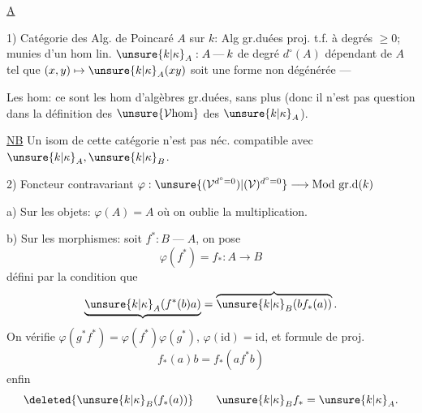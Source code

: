 
\uline{A}

1) Catégorie  des Alg. de Poincaré $A$ sur $k$: Alg gr.duées proj.  t.f. à degrés $\geq0$; munies d'un hom lin. $\unsure{k|\kappa}_A:A\mathbin{\text{---}}k$ de degré $d^\circ(A)$ dépendant de $A$ tel que $(x,y)\mapsto\unsure{k|\kappa}_A(xy)$ soit une forme  non dégénérée ---

Les hom: ce sont les hom d'algèbres gr.duées, sans plus (donc il n'est pas question dans la définition des $\unsure{\mathcal V\mathrm{hom}}$ des $\unsure{k|\kappa}_A$).

\uline{NB} Un isom de cette catégorie n'est pas néc. compatible avec  $\unsure{k|\kappa}_A,\unsure{k|\kappa}_B$.

2) Foncteur contravariant $\varphi:\unsure{(\mathcal V^{d^\circ=0})|(\mathcal V)^{d^\circ=0}}\longrightarrow\mathrm{Mod\ gr.d}(k)$

\quad a) Sur les objets: $\varphi(A)=A$ où on oublie la multiplication.

\quad b) Sur les morphismes: soit $f^*:B\mathbin{\text{---}}A$, on pose
\[
\varphi(f^*)=f_*:A\longrightarrow B
\]
défini par la condition que
\[
\underbrace{\unsure{k|\kappa}_A(f^*(b)a)}
=\overbrace{\unsure{k|\kappa}_B(bf_*(a))}.
\]
On vérifie $\varphi(g^*f^*)=\varphi(f^*)\varphi(g^*)$, $\varphi(\mathrm{id})=\mathrm{id}$, et formule de proj.
\[
f_*(a)b=f_*(af^*b)
\]
enfin
\[
\deleted{\unsure{k|\kappa}_B(f_*(a))}\qquad
\unsure{k|\kappa}_Bf_*=\unsure{k|\kappa}_A.
\]
